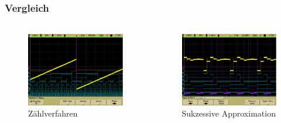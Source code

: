 \begin{frame}
    \frametitle{Vergleich}
    \framesubtitle{}
    \begin{columns}[c]
            \begin{figure}[H]
            \begin{center}
                    \includegraphics[scale=0.15]{./img/oszi/scope_5.png}
            \end{center}
            \caption{Zählverfahren}
            \end{figure}
            \begin{figure}[H]
            \begin{center}
                    \includegraphics[scale=0.15]{./img/oszi/scope_6.png}
            \end{center}
            \caption{Sukzessive Approximation}
            \end{figure}
    \end{columns}
\end{frame}
